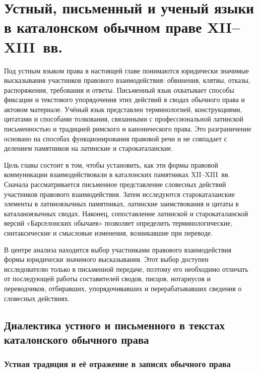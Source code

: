 
\chapter{Устный, письменный и ученый языки в каталонском обычном праве XII--XIII~вв.}

Под устным языком права в настоящей главе понимаются юридически значимые высказывания участников правового взаимодействия: обвинения, клятвы, отказы, распоряжения, требования и ответы. Письменный язык охватывает способы фиксации и текстового упорядочения этих действий в сводах обычного права и актовом материале. Учёный язык представлен терминологией, конструкциями, цитатами и способами толкования, связанными с профессиональной латинской письменностью и традицией римского и канонического права. Это разграничение основано на способах функционирования правовой речи и не совпадает с делением памятников на латинские и старокаталанские.

Цель главы состоит в том, чтобы установить, как эти формы правовой коммуникации взаимодействовали в каталонских памятниках XII--XIII~вв. Сначала рассматривается письменное представление словесных действий участников правового взаимодействия. Затем исследуются старокаталанские элементы в латиноязычных памятниках, латинские заимствования и цитаты в каталаноязычных сводах. Наконец, сопоставление латинской и старокаталанской версий «Барселонских обычаев» позволяет определить терминологические, синтаксические и смысловые изменения, возникавшие при переводе.

В центре анализа находится выбор участниками правового взаимодействия формы юридически значимого высказывания. Этот выбор доступен исследователю только в письменной передаче, поэтому его необходимо отличать от последующей работы составителей сводов, писцов, нотариусов и переводчиков, отбиравших, упорядочивавших и перерабатывавших сведения о словесных действиях.

\section{Диалектика устного и письменного в текстах каталонского обычного права}

\subsection{Устная традиция и её отражение в записях обычного права}

